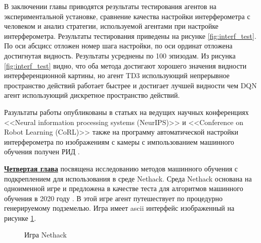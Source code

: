 В заключении главы приводятся результаты тестирования агентов на экспериментальной установке, сравнение качества настройки интерферометра с человеком и анализ стратегии, используемой агентами при настройке интерферометра. Результаты тестирования приведены на рисунке \ref{fig:interf_test}. По оси абсцисс отложен номер шага настройки, по оси ординат отложена достигнутая видность. Результаты усреднены по 100 эпизодам. Из рисунка \ref{fig:interf_test} видно, что оба метода достигают хорошего значения видности интерференционной картины, но агент TD3 использующий непрерывное пространство действий работает быстрее и достигает лучшей видности чем DQN агент использующий дискретное пространство действий. 

Разультаты работы опубликованы в статьях \cite{confbib1, confbib2} на ведущих научных конференциях <<Neural information processing systems (NeurIPS)>> и <<Conference on Robot Learning (CoRL)>> также на программу автоматической настройки интерферометра по изображениям с камеры с импользованием машинного обучения получен РИД \cite{progbib1}.

\underline{\textbf{Четвертая глава}} посвящена исследованию методов машинного обучения с подкреплением для использования в среде Nethack. Среда Nethack основана на одноименной игре и предложена в качестве теста для алгоритмов машинного обучения в 2020 году \cite{nethack}. В этой игре агент путешествует по процедурно генерируемому подземелью. Игра имеет ascii интерфейс изображенный на рисунке \ref{fig:nethack}.

\begin{figure}[ht]
    \caption{Игра Nethack}\label{fig:nethack}
\end{figure}


